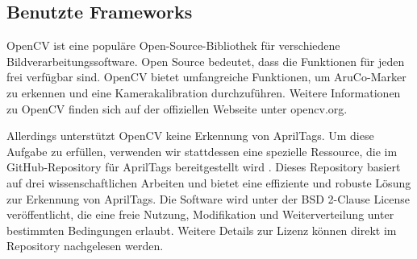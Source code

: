 \subsection{Benutzte Frameworks}
OpenCV ist eine populäre Open-Source-Bibliothek für verschiedene Bildverarbeitungssoftware.
Open Source bedeutet, dass die Funktionen für jeden frei verfügbar sind. OpenCV bietet 
umfangreiche Funktionen, um AruCo-Marker zu erkennen und eine Kamerakalibration durchzuführen.
Weitere Informationen zu OpenCV finden sich auf der offiziellen Webseite unter opencv.org.

Allerdings unterstützt OpenCV keine Erkennung von AprilTags. Um diese Aufgabe zu erfüllen, verwenden 
wir stattdessen eine spezielle Ressource, die im GitHub-Repository für AprilTags bereitgestellt 
wird \cite{apriltag_github}. Dieses Repository basiert auf drei wissenschaftlichen Arbeiten 
\cite{olson2011tags} \cite{wang2016iros} \cite{krogius2019iros} und bietet eine effiziente 
und robuste Lösung zur Erkennung von AprilTags. Die Software wird unter der BSD 2-Clause License 
veröffentlicht, die eine freie Nutzung, Modifikation und Weiterverteilung unter bestimmten Bedingungen 
erlaubt. Weitere Details zur Lizenz können direkt im Repository nachgelesen werden.